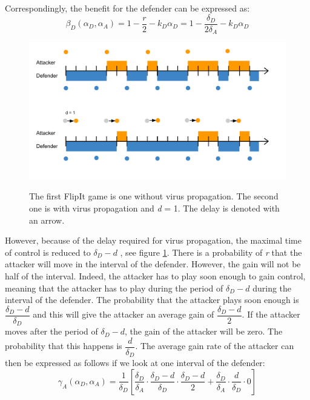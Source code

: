 \documentclass[master=cws, masteroption=vs]{kulemt}
\begin{document}
\begin{abstract*}
Correspondingly, the benefit for the defender can be expressed as:
\begin{equation}\label{first}
\beta_{D}(\alpha_{D},\alpha_{A}) =1 -  \dfrac {r} {2} - k_{D} \alpha_{D} = 1 - \dfrac {\delta_{D}} {2\delta_{A}} - k_{D} \alpha_{D} 
\end{equation}

\begin{figure}[hbtp]
\caption{The first FlipIt game is one without virus propagation. The second one is with virus propagation and \textit{d} = 1. The delay is denoted with an arrow.}
\centering
\includegraphics[scale=0.4]{../../doc/template/Images/FLipItCase1.pdf}
\label{fig:delaycase1}
\end{figure}


However, because of the delay required for virus propagation, the maximal time of control is reduced to $\delta_{D}-d$ , see figure \ref{fig:delaycase1}. There is a probability of \textit{r} that the attacker will move in the interval of the defender. However, the gain will not be half of the interval. Indeed, the attacker has to play soon enough to gain control, meaning that the attacker has to play during the period of $\delta_{D}-d$ during the interval of the defender. The probability that the attacker plays soon enough is $\dfrac{\delta_{D}-d}{\delta_{D}}$ and this will give the attacker an average gain of $\dfrac{\delta_{D}-d}{2}$. If the attacker moves after the period of $\delta_{D}-d$, the gain of the attacker will be zero. The probability that this happens is  $\dfrac{d}{\delta_{D}}$. The average gain rate of the attacker can then be expressed as follows if we look at one interval of the defender:
\begin{equation}\label{first}
\gamma_{A}(\alpha_{D},\alpha_{A}) = \dfrac {1}{\delta_{D}} [ \dfrac{\delta_{D}}{\delta_{A}} \cdot \dfrac{\delta_{D}-d}{\delta_{D}} \cdot \dfrac{\delta_{D}-d}{2} + \dfrac{\delta_{D}}{\delta_{A}} \cdot \dfrac{d}{\delta_{D}} \cdot 0 ]
\end{equation}


\end{abstract*}
\end{document}
